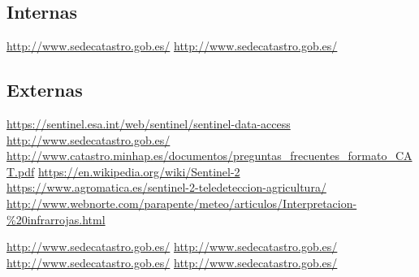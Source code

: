 

\begin{thebibliography}{}


\subsection*{Internas}

 \url{http://www.sedecatastro.gob.es/}
 \url{http://www.sedecatastro.gob.es/}

\subsection*{Externas}

 \url{https://sentinel.esa.int/web/sentinel/sentinel-data-access}
 \url{http://www.sedecatastro.gob.es/}
 \url{http://www.catastro.minhap.es/documentos/preguntas_frecuentes_formato_CAT.pdf}
\url{https://en.wikipedia.org/wiki/Sentinel-2}
\url{https://www.agromatica.es/sentinel-2-teledeteccion-agricultura/}
\url{http://www.webnorte.com/parapente/meteo/articulos/Interpretacion-%20infrarrojas.html}

 \url{http://www.sedecatastro.gob.es/}
 \url{http://www.sedecatastro.gob.es/}
 \url{http://www.sedecatastro.gob.es/}
 \url{http://www.sedecatastro.gob.es/}

\clearpage
\end{thebibliography}
